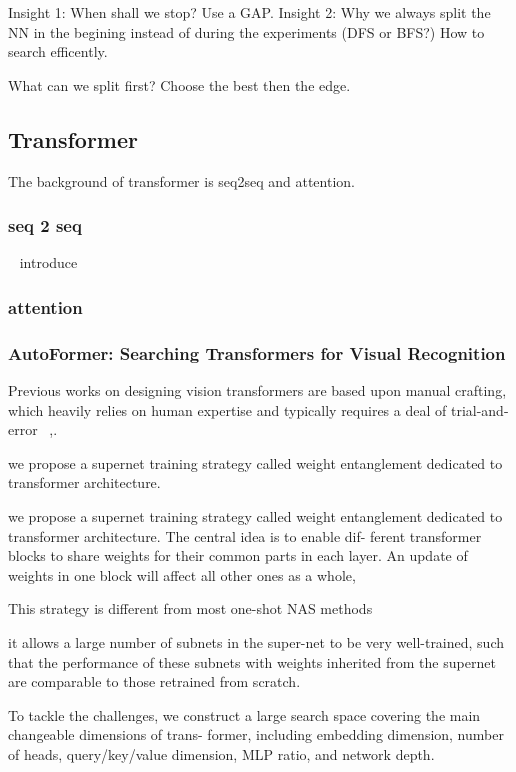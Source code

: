 \documentclass[UTF8]{article}
\begin{document}
Insight 1: When shall we stop? Use a GAP.
Insight 2: Why we always split the NN in the begining instead of during the experiments (DFS or BFS?) How to search efficently.

What can we split first? Choose the best then the edge.

\subsection{Transformer}

The background of transformer is seq2seq and attention.
\subsubsection{seq 2 seq}
~\cite{sutskever2014sequence} introduce 
\subsubsection{attention}

\subsubsection{AutoFormer: Searching Transformers for Visual Recognition}
Previous works on designing vision transformers are based upon manual crafting, which heavily relies on human expertise and typically requires a deal of trial-and- error ~\cite{yuan2021tokens, touvron2021training, dosovitskiy2020image},.

we propose a supernet training strategy called weight entanglement dedicated to transformer architecture. 

we propose a supernet training strategy called weight entanglement dedicated to transformer architecture. The central idea is to enable dif- ferent transformer blocks to share weights for their common parts in each layer. An update of weights in one block will affect all other ones as a whole,

This strategy is different from most one-shot NAS methods \cite{guo2020single, chu2021fairnas, wu2019fbnet}

it allows a large number of subnets in the super-net to be very well-trained, such that the performance of these subnets with weights inherited from the supernet are comparable to those retrained from scratch.

To tackle the challenges, we construct a large search space covering the main changeable dimensions of trans- former, including embedding dimension, number of heads, query/key/value dimension, MLP ratio, and network depth.
\end{document}

